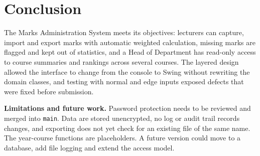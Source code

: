 \section{Conclusion}\label{sec:concl}

The Marks Administration System meets its objectives: lecturers can capture, import and export marks with automatic weighted calculation, missing marks are flagged and kept out of statistics, and a Head of Department has read-only access to course summaries and rankings across several courses. The layered design allowed the interface to change from the console to Swing without rewriting the domain classes, and testing with normal and edge inputs exposed defects that were fixed before submission.

\textbf{Limitations and future work.} Password protection needs to be reviewed and merged into \texttt{main}. Data are stored unencrypted, no log or audit trail records changes, and exporting does not yet check for an existing file of the same name. The year-course functions are placeholders. A future version could move to a database, add file logging and extend the access model.

